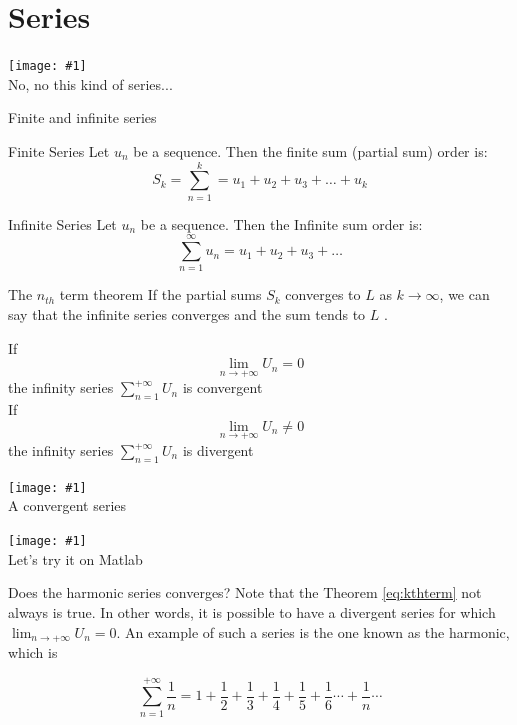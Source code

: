 \documentclass[newPxFont]{beamer}
\newcommand \imageFrame[2]{
\begingroup
\begin{frame}
  \begin{center}
\texttt{[image: \#1]}\\
\Large #2
    \end{center}
\end{frame}
\endgroup
}
\begin{document}
\section{Series}
\imageFrame{netflix}{No, no this kind of series...}
\begin{frame}{Finite and infinite series}
  \begin{block}{Finite Series}
    Let ${u_n}$ be a sequence. Then the finite sum (partial sum) order is:\\
    \begin{equation}
        S_k=\sum_{n=1}^{k}=u_1+u_2+u_3+\hdots+u_k
    \end{equation}
  \end{block}
  \pause
  \begin{block}{Infinite Series}
    Let ${u_n}$ be a sequence. Then the Infinite sum order is:\\
    \begin{equation}
        \sum_{n=1}^\infty u_n=u_1+u_2+u_3+\hdots
    \end{equation}
  \end{block}
\end{frame}
\begin{frame}{The $n_{th}$ term theorem}
If the partial sums $S_k$ converges to $L$ as $k\longrightarrow \infty$,
  we can say that the infinite series converges and the sum
  tends to $L$ \cite{Math242017}.

\begin{theorem}
If
\begin{equation}
  \lim_{n \to +\infty} U_n=0\label{eq:kthterm}
\end{equation}
the infinity series $\sum_{n=1}^{+\infty} U_n$ is \alert{convergent}
\vspace{0.2in}\\
If
\begin{equation}
  \lim_{n \to +\infty} U_n\neq0
\end{equation}
the infinity series $\sum_{n=1}^{+\infty} U_n$ is \alert{divergent}
\end{theorem}
\end{frame}
\imageFrame{L}{A convergent series}
\imageFrame{exer2}{Let's try it on \alert{Matlab}}
\begin{frame}{Does the harmonic series converges?}
Note that the Theorem \eqref{eq:kthterm} not always is true. In other words, it is possible to have a \alert{divergent} series for which $\lim_{n \to +\infty} U_n=0$. An example of such a series is the one known as the harmonic, which is

\pause
\begin{equation}
  \sum_{n=1}^{+\infty} \frac{1}{n}=1+\frac{1}{2}+\frac{1}{3}+\frac{1}{4}+\frac{1}{5}+\frac{1}{6}\cdots+\frac{1}{n}\cdots
\end{equation}
\end{frame}
\end{document}
